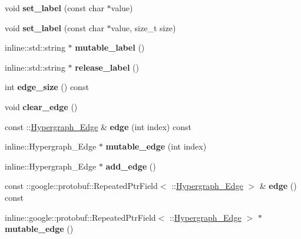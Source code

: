 \begin{DoxyCompactItemize}
\item 
\hypertarget{classHypergraph__Node_a7b48964a1cf2a5d8964873751733b217}{
void {\bfseries set\_\-label} (const char $\ast$value)}
\label{classHypergraph__Node_a7b48964a1cf2a5d8964873751733b217}

\item 
\hypertarget{classHypergraph__Node_a9838f053ff36a98ce5050537c5c5ff1b}{
void {\bfseries set\_\-label} (const char $\ast$value, size\_\-t size)}
\label{classHypergraph__Node_a9838f053ff36a98ce5050537c5c5ff1b}

\item 
\hypertarget{classHypergraph__Node_a4f18ad8fd086fe65568514a0ad2d2bda}{
inline::std::string $\ast$ {\bfseries mutable\_\-label} ()}
\label{classHypergraph__Node_a4f18ad8fd086fe65568514a0ad2d2bda}

\item 
\hypertarget{classHypergraph__Node_a64844aa6ea220f1bc99a66236171ca85}{
inline::std::string $\ast$ {\bfseries release\_\-label} ()}
\label{classHypergraph__Node_a64844aa6ea220f1bc99a66236171ca85}

\item 
\hypertarget{classHypergraph__Node_a444e336785528842df37d3279b61e646}{
int {\bfseries edge\_\-size} () const }
\label{classHypergraph__Node_a444e336785528842df37d3279b61e646}

\item 
\hypertarget{classHypergraph__Node_a8148d16453c80519f253274f3a6a5cd1}{
void {\bfseries clear\_\-edge} ()}
\label{classHypergraph__Node_a8148d16453c80519f253274f3a6a5cd1}

\item 
\hypertarget{classHypergraph__Node_ad1977037e1e9dbf52400a43db4617814}{
const ::\hyperlink{classHypergraph__Edge}{Hypergraph\_\-Edge} \& {\bfseries edge} (int index) const }
\label{classHypergraph__Node_ad1977037e1e9dbf52400a43db4617814}

\item 
\hypertarget{classHypergraph__Node_a83374115326fc7d5161bd7b785e93aa7}{
inline::Hypergraph\_\-Edge $\ast$ {\bfseries mutable\_\-edge} (int index)}
\label{classHypergraph__Node_a83374115326fc7d5161bd7b785e93aa7}

\item 
\hypertarget{classHypergraph__Node_a9091d554b8ffa84279859974220c1e7f}{
inline::Hypergraph\_\-Edge $\ast$ {\bfseries add\_\-edge} ()}
\label{classHypergraph__Node_a9091d554b8ffa84279859974220c1e7f}

\item 
\hypertarget{classHypergraph__Node_a8bcc9f22da4f01c9b231e46c5fe18345}{
const ::google::protobuf::RepeatedPtrField$<$ ::\hyperlink{classHypergraph__Edge}{Hypergraph\_\-Edge} $>$ \& {\bfseries edge} () const }
\label{classHypergraph__Node_a8bcc9f22da4f01c9b231e46c5fe18345}

\item 
\hypertarget{classHypergraph__Node_aade5e0d2caa34c230b34dc4a1af468bf}{
inline::google::protobuf::RepeatedPtrField$<$ ::\hyperlink{classHypergraph__Edge}{Hypergraph\_\-Edge} $>$ $\ast$ {\bfseries mutable\_\-edge} ()}
\label{classHypergraph__Node_aade5e0d2caa34c230b34dc4a1af468bf}

\end{DoxyCompactItemize}
